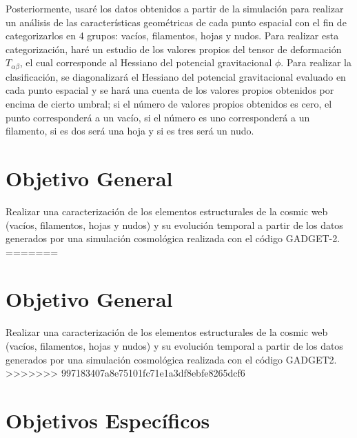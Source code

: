 \documentclass{article}
\begin{document}
Posteriormente, usaré los datos obtenidos a partir de la simulación para realizar un análisis de las características geométricas de cada punto espacial con el fin de categorizarlos en 4 grupos: vacíos, filamentos, hojas y nudos. Para realizar esta categorización, haré un estudio de los valores propios del tensor de deformación $T_{\alpha\beta}$, el cual corresponde al Hessiano del potencial gravitacional $\phi$\cite{Forero-Romero}\cite{tv-web}. Para realizar la clasificación, se diagonalizará el Hessiano del potencial gravitacional evaluado en cada punto espacial y se hará una cuenta de los valores propios obtenidos por encima de cierto umbral; si el número de valores propios obtenidos es cero, el punto corresponderá a un vacío, si el número es uno corresponderá a un filamento, si es dos será una hoja y si es tres será un nudo.    

\section{Objetivo General}

Realizar una caracterización de los elementos estructurales de la cosmic web (vacíos, filamentos, hojas y nudos) y su evolución temporal a partir de los datos generados por una simulación cosmológica realizada con el código GADGET-2.
=======

\section{Objetivo General}

Realizar una caracterización de los elementos estructurales de la
cosmic web (vacíos, filamentos, hojas y nudos) y su evolución temporal
a partir de los datos generados por una simulación cosmológica
realizada con el código GADGET2. 
>>>>>>> 997183407a8e75101fc71e1a3df8ebfe8265dcf6

\section{Objetivos Específicos}
\end{document}
